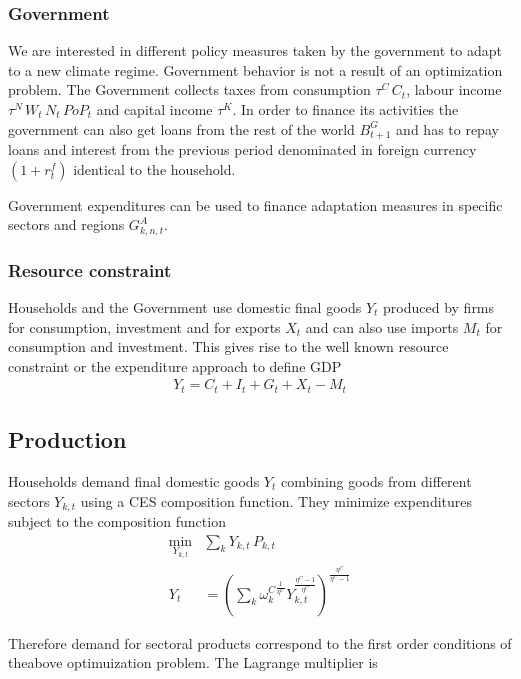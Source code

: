 \documentclass[10pt,a4paper]{article}
\begin{document}
\subsubsection{Government}

We are interested in different policy measures taken by the government to adapt to a new climate regime. Government behavior is not a result of an optimization problem. The Government collects taxes from consumption $\tau^{C} \, C_{t}$, labour income $\tau^{N} \, W_{t} \, N_{t} \, PoP_{t}$ and capital income $\tau^{K}$. In order to finance its activities the government can also get loans from the rest of the world $B^{G}_{t+1}$ and has to repay loans and interest from the previous period denominated in foreign currency $(1 + r^{f}_{t})$ identical to the household. 

Government expenditures can be used to finance adaptation measures in specific sectors and regions $G^{A}_{k,n,t}$.

\subsubsection{Resource constraint}

Households and the Government use domestic final goods $Y_t$ produced by firms for consumption, investment and for exports $X_{t}$ and can also use imports $M_t$ for consumption and investment. This gives rise to the well known resource constraint or the expenditure approach to define GDP 
\begin{align}
Y_{t} = C_{t} + I_{t} + G_{t} + X_{t} - M_{t} 
\end{align}

\subsection{Production}

Households demand final domestic goods $Y_{t}$ combining goods from different sectors $Y_{k,t}$ using a CES composition function. They minimize expenditures subject to the composition function
\begin{align}
\underset{Y_{k,t}}{\mathrm{min}} & \sum_{k} Y_{k,t} \, P_{k,t} \\ 
Y_{t} &= \left(\sum_{k} {\omega^{C}_{k}}^{\frac{1}{\eta^C}} Y_{k,t}^{\frac{\eta^C-1}{\eta^C}} \right)^{\frac{\eta^C}{\eta^C-1}}
\end{align}

Therefore demand for sectoral products correspond to the first order conditions of theabove optimuization problem. The Lagrange multiplier is 
\end{document}

